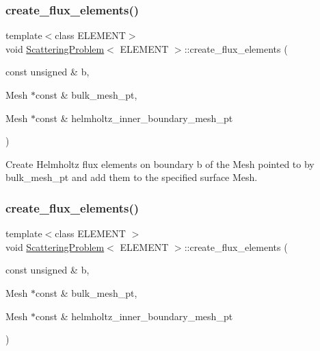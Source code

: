 \mbox{\label{classScatteringProblem_af06ff518ad3250f914c0c659af3001c8}} 
\subsubsection{\texorpdfstring{create\+\_\+flux\+\_\+elements()}{create\_flux\_elements()}\hspace{0.1cm}{\footnotesize\ttfamily [1/2]}}
{\footnotesize\ttfamily template$<$class E\+L\+E\+M\+E\+NT$>$ \\
void \hyperlink{classScatteringProblem}{Scattering\+Problem}$<$ E\+L\+E\+M\+E\+NT $>$\+::create\+\_\+flux\+\_\+elements (\begin{DoxyParamCaption}\item[{const unsigned \&}]{b,  }\item[{Mesh $\ast$const \&}]{bulk\+\_\+mesh\+\_\+pt,  }\item[{Mesh $\ast$const \&}]{helmholtz\+\_\+inner\+\_\+boundary\+\_\+mesh\+\_\+pt }\end{DoxyParamCaption})}



Create Helmholtz flux elements on boundary b of the Mesh pointed to by bulk\+\_\+mesh\+\_\+pt and add them to the specified surface Mesh. 

\mbox{\label{classScatteringProblem_af06ff518ad3250f914c0c659af3001c8}} 
\subsubsection{\texorpdfstring{create\+\_\+flux\+\_\+elements()}{create\_flux\_elements()}\hspace{0.1cm}{\footnotesize\ttfamily [2/2]}}
{\footnotesize\ttfamily template$<$class E\+L\+E\+M\+E\+NT $>$ \\
void \hyperlink{classScatteringProblem}{Scattering\+Problem}$<$ E\+L\+E\+M\+E\+NT $>$\+::create\+\_\+flux\+\_\+elements (\begin{DoxyParamCaption}\item[{const unsigned \&}]{b,  }\item[{Mesh $\ast$const \&}]{bulk\+\_\+mesh\+\_\+pt,  }\item[{Mesh $\ast$const \&}]{helmholtz\+\_\+inner\+\_\+boundary\+\_\+mesh\+\_\+pt }\end{DoxyParamCaption})}



